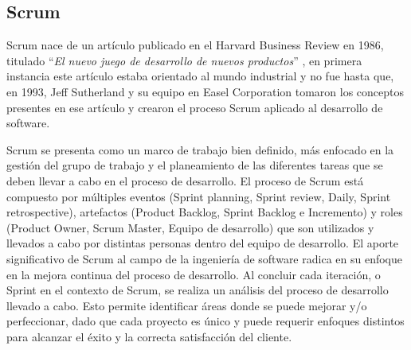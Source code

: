 \documentclass[a4paper,10pt]{article}
\begin{document}
	\subsection{Scrum}
	Scrum nace de un artículo publicado en el Harvard Business Review en 1986, titulado “\textit{El nuevo juego de desarrollo de nuevos productos}” \parencite{Takeuchi_Nonaka_1986}, en primera instancia este artículo estaba orientado al mundo industrial y no fue hasta que, en 1993, Jeff Sutherland y su equipo en Easel Corporation tomaron los conceptos presentes en ese artículo y crearon el proceso Scrum aplicado al desarrollo de software.
	
	Scrum se presenta como un marco de trabajo bien definido, más enfocado en la gestión del grupo de trabajo y el planeamiento de las diferentes tareas que se deben llevar a cabo en el proceso de desarrollo. El proceso de Scrum está compuesto por múltiples eventos (Sprint planning, Sprint review, Daily, Sprint retrospective), artefactos (Product Backlog, Sprint Backlog e Incremento) y roles (Product Owner, Scrum Master, Equipo de desarrollo) que son utilizados y llevados a cabo por distintas personas dentro del equipo de desarrollo. El aporte significativo de Scrum al campo de la ingeniería de software radica en su enfoque en la mejora continua del proceso de desarrollo. Al concluir cada iteración, o Sprint en el contexto de Scrum, se realiza un análisis del proceso de desarrollo llevado a cabo. Esto permite identificar áreas donde se puede mejorar y/o perfeccionar, dado que cada proyecto es único y puede requerir enfoques distintos para alcanzar el éxito y la correcta satisfacción del cliente.
	
\end{document}
